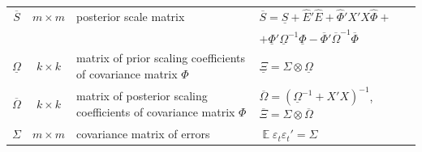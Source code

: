\documentclass[11pt]{article} %
\DeclareMathOperator{\E}{\mathbb{E}}
\newcommand{\prior}{\underline}
\newcommand{\post}{\overline}
\begin{document}
\begin{center}
\begin{tabular}{ccp{6cm}l}
$\post S $ & $m \times m$ & posterior scale matrix&  $\post S=\prior S +\hat E'\hat E+\hat \Phi'
 X'X \hat \Phi+$\\&&&$ +\prior \Phi'\prior\Omega^{-1}\prior \Phi-\post \Phi'\post\Omega^{-1}\post \Phi$\\
\midrule %
$\prior \Omega$ & $k \times k$ & matrix of prior scaling coefficients of covariance matrix $\Phi$& $\prior \Xi = \Sigma \otimes \prior \Omega$ \\
$\post \Omega$ & $k \times k$ & matrix of posterior scaling coefficients of covariance matrix $\Phi$&  $\post \Omega = (\prior\Omega^{-1}+ X'X)^{-1}$,  $\post \Xi = \Sigma \otimes \post \Omega$\\
$\Sigma$ & $m \times m$ &covariance matrix of errors& $\E\varepsilon_t \varepsilon _t'=\Sigma$\\
\bottomrule
\end{tabular}
\end{center}
\newpage
\end{document}
